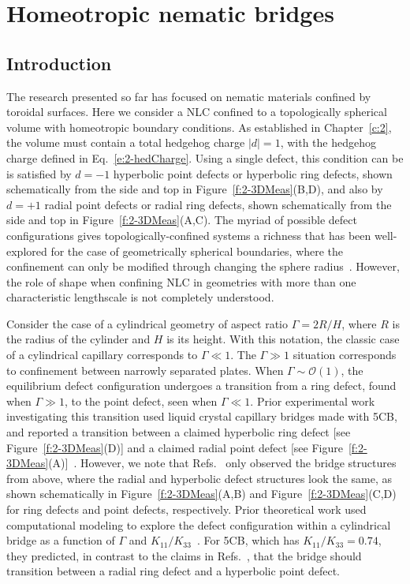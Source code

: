 \chapter{Homeotropic nematic bridges}

\section{Introduction}
The research presented so far has focused on nematic materials confined by toroidal surfaces.
Here we consider a NLC confined to a topologically spherical volume with homeotropic boundary conditions.
As established in Chapter~\ref{c:2}, the volume must contain a total hedgehog charge $|d| = 1$, with the hedgehog charge defined in Eq.~\ref{e:2-hedCharge}.
Using a single defect, this condition can be is satisfied by $d=-1$ hyperbolic point defects or hyperbolic ring defects, shown schematically from the side and top in Figure~\ref{f:2-3DMeas}(B,D), and also by $d=+1$ radial point defects or radial ring defects, shown schematically from the side and top in Figure~\ref{f:2-3DMeas}(A,C).
The myriad of possible defect configurations gives topologically-confined systems a richness that has been well-explored for the case of geometrically spherical boundaries, where the confinement can only be modified through changing the sphere radius~\cite{RN150,RN277,RN278,RN275,RN276}.
However, the role of shape when confining NLC in geometries with more than one characteristic lengthscale is not completely understood.

Consider the case of a cylindrical geometry of aspect ratio $\Gamma = 2 R/H$, where $R$ is the radius of the cylinder and $H$ is its height.
With this notation, the classic case of a cylindrical capillary corresponds to $\Gamma \ll 1$. The $\Gamma \gg 1$ situation corresponds to confinement between narrowly separated plates.
When $\Gamma \sim \mathcal{O}\left( 1 \right)$, the equilibrium defect configuration undergoes a transition from a ring defect, found when $\Gamma \gg 1$, to the point defect, seen when $\Gamma \ll 1$.
Prior experimental work investigating this transition used liquid crystal capillary bridges made with 5CB, and reported a transition between a claimed hyperbolic ring defect [see Figure~\ref{f:2-3DMeas}(D)] and a claimed radial point defect [see Figure~\ref{f:2-3DMeas}(A)]~\cite{RN139,RN147}.
However, we note that Refs.~\cite{RN139,RN147} only observed the bridge structures from above, where the radial and hyperbolic defect structures look the same, as shown schematically in Figure~\ref{f:2-3DMeas}(A,B) and Figure~\ref{f:2-3DMeas}(C,D) for ring defects and point defects, respectively.
Prior theoretical work used computational modeling to explore the defect configuration within a cylindrical bridge as a function of $\Gamma$ and $K_{11}/K_{33}$~\cite{RN138,RN144}.
For 5CB, which has $K_{11}/K_{33} = 0.74$, they predicted, in contrast to the claims in Refs.~\cite{RN139,RN147}, that the bridge should transition between a radial ring defect and a hyperbolic point defect.

